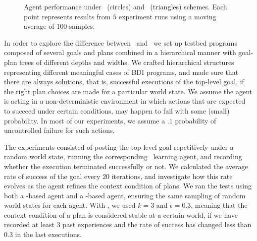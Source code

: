 \begin{figure*}[t]
\begin{center}
{\begin{tikzpicture}[x=0.00108cm,y=4cm]
\end{tikzpicture}
}
\caption{Agent performance under \BUL\ (circles) and \CL\ (triangles) schemes. Each point represents results from $5$ experiment runs using a moving average of $100$ samples.}
\end{center}
\end{figure*}


In order to explore the difference between \BUL\ and \CL\ we 
set up testbed programs composed of several goals and plans combined
in a hierarchical manner with goal-plan trees of different depths and
widths. We crafted hierarchical structures representing
different meaningful cases of BDI programs, and made sure that there
are always solutions, that is, successful executions of the top-level
goal, if the right plan choices are made for a particular world state. 
%
%
We assume the agent is acting in a non-deterministic environment in
which actions that are expected to succeed under certain conditions,
may happen to fail with some (small) probability. In most of our
experiments, we assume a $.1$ probability of uncontrolled failure for
such actions. 

The experiments consisted of posting the top-level goal repetitively
under a random world state, running the corresponding \JACK\ learning
agent, and recording whether the execution terminated successfully or
not. We calculated the average rate of success of the goal every  $20$
iterations, and investigate how this rate evolves as the agent refines
the context condition of plans. 
%
We ran the tests using both a \BUL-based agent and a \CL-based
agent, ensuring the same sampling of random world states for each
agent. 
%
With \BUL, we used $k=3$ and $\epsilon=0.3$, meaning that
the context condition of a plan is considered stable at a certain
world, if we have recorded at least $3$ past experiences and the rate
of success has changed less than $0.3$ in the last executions.
%

